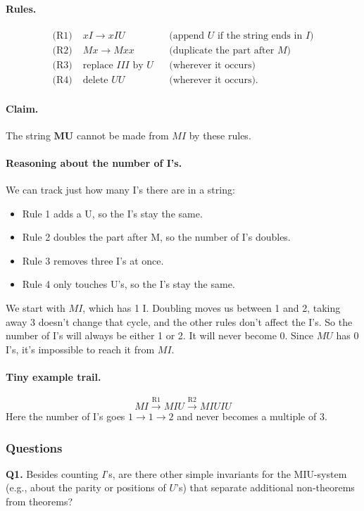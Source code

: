 \documentclass{article}
\theoremstyle{theorem}
\theoremstyle{definition}
\theoremstyle{remark}
\begin{document}
\paragraph{Rules.}
\begin{align*}
\text{(R1)}\;& xI \rightarrow xIU && \text{(append $U$ if the string ends in $I$)}\\
\text{(R2)}\;& Mx \rightarrow Mxx && \text{(duplicate the part after $M$)}\\
\text{(R3)}\;& \text{replace }III\text{ by }U && \text{(wherever it occurs)}\\
\text{(R4)}\;& \text{delete }UU && \text{(wherever it occurs).}
\end{align*}

\paragraph{Claim.} The string $\mathbf{MU}$ cannot be made from $MI$ by these rules.

\paragraph{Reasoning about the number of I's.}
We can track just how many I’s there are in a string:

\begin{itemize}
  \item Rule 1 adds a U, so the I’s stay the same.
  \item Rule 2 doubles the part after M, so the number of I’s doubles.
  \item Rule 3 removes three I’s at once.
  \item Rule 4 only touches U’s, so the I’s stay the same.
\end{itemize}

We start with $MI$, which has 1 I. Doubling moves us between 1 and 2, taking away 3 doesn’t change that cycle, and the other rules don’t affect the I’s. So the number of I’s will always be either 1 or 2. It will never become 0. Since $MU$ has 0 I’s, it’s impossible to reach it from $MI$.

\paragraph{Tiny example trail.}
\[
MI \xrightarrow{\text{R1}} MIU \xrightarrow{\text{R2}} MIUIU
\]
Here the number of I’s goes $1 \to 1 \to 2$ and never becomes a multiple of $3$.

\subsubsection{Questions}
\textbf{Q1.} Besides counting $I$'s, are there other simple invariants for the MIU-system (e.g., about the parity or positions of $U$'s) that separate additional non-theorems from theorems?
\end{document}
